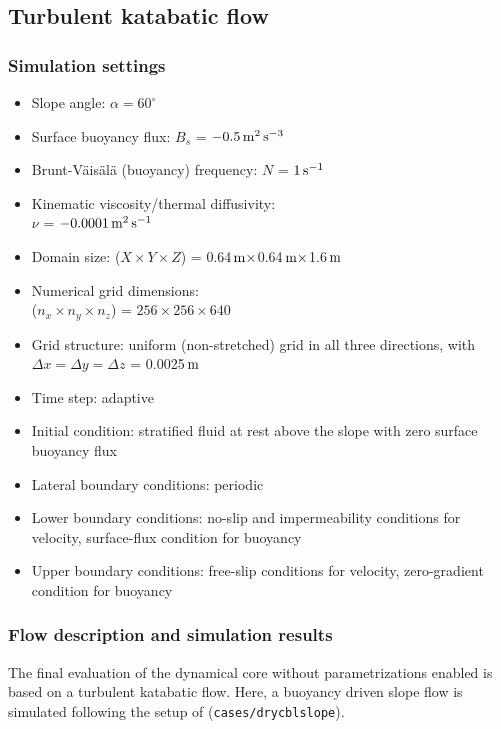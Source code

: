 \documentclass[gmd]{copernicus}
\begin{document}
\subsection{Turbulent katabatic flow}
\subsubsection{Simulation settings}
\begin{itemize}
	\setlength{\itemsep}{0pt}
	\setlength{\parskip}{0pt}
	\setlength{\parsep}{0pt}  
	\item Slope angle: $\alpha = 60^{\circ}$
	\item Surface buoyancy flux: $B_{s} $ = $-0.5{\rm\, m}^{\rm 2}\, {\rm s}^{{\rm -3}} $
	\item Brunt-V\"{a}is\"{a}l\"{a} (buoyancy) frequency: $N$ = $1\,{\rm s}^{{\rm -1}}$
	\item Kinematic viscosity/thermal diffusivity:\\$\nu$ = $-0.0001{\rm\, m}^{\rm 2}\, {\rm s}^{{\rm -1}} $
	\item Domain size: ($X{\times}Y{\times}Z$) = 0.64${\rm\, m}\times$0.64${\rm\, m}\times$1.6${\rm\, m}$
	\item Numerical grid dimensions: \\($n_x{\times}n_y{\times}n_z$) = $256 \times 256 \times 640$
	\item Grid structure: uniform (non-stretched) grid in all three directions, with $\Delta x = \Delta y = \Delta z$ = 0.0025${\rm\, m}$
	\item Time step: adaptive
	\item Initial condition: stratified fluid at rest above the slope with zero surface buoyancy flux
	\item Lateral boundary conditions: periodic
	\item Lower boundary conditions: no-slip and impermeability conditions for velocity, surface-flux condition for buoyancy
	\item Upper boundary conditions: free-slip conditions for velocity, zero-gradient condition for buoyancy
\end{itemize}

\subsubsection{Flow description and simulation results}
The final evaluation of the dynamical core without parametrizations enabled is based on a turbulent katabatic flow. Here, a buoyancy driven slope flow is simulated following the setup of \citet{Fedorovich2009} (\texttt{cases/drycblslope}).
\end{document}
